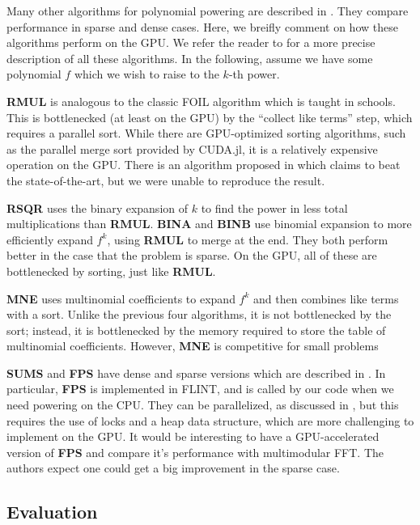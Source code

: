 Many other algorithms 
for polynomial powering
are described in \cite{monagan-2012-sparse-powering}. 
They compare performance in sparse and dense cases. 
Here, we breifly comment on how these algorithms perform on the GPU.
We refer the reader to \cite{monagan-2012-sparse-powering}
for a more precise description of all these algorithms.
In the following, assume we have some polynomial \(f\) which we wish 
to raise to the \(k\)-th power.

\textbf{RMUL} is analogous to the classic FOIL algorithm which is taught in schools. 
This is bottlenecked (at least on the GPU) by the ``collect like terms'' step, 
which requires a parallel sort.
While there are GPU-optimized sorting algorithms, such as the parallel merge sort
provided by CUDA.jl, it is a relatively expensive operation on the GPU.
There is an algorithm proposed in \cite{gupta-2023-gpu-sort}
which claims to beat the state-of-the-art, but we were unable to reproduce the result.

\textbf{RSQR} uses the binary expansion of \(k\) to find the power in less
total multiplications than \textbf{RMUL}.
\textbf{BINA} and \textbf{BINB} use binomial expansion to more efficiently 
expand \(f^{k}\), using \textbf{RMUL} to merge at the end.
They both perform better in the case that the problem is sparse.
On the GPU, all of these are bottlenecked by sorting, just like
\textbf{RMUL}.

\textbf{MNE} uses multinomial coefficients to expand \(f^{k}\) 
and then combines like terms with a sort. 
Unlike the previous four algorithms, it is not bottlenecked by the sort;
instead, it is bottlenecked by the memory required to store the table of
multinomial coefficients. However, \textbf{MNE} is 
competitive for small problems

\textbf{SUMS} and \textbf{FPS} have dense and sparse versions which are described in 
\cite{monagan-2012-sparse-powering}.
In particular, \textbf{FPS} is implemented in FLINT, and is called by our
code when we need powering on the CPU.
They can be parallelized, as discussed in \cite{monagan-2012-sparse-powering},
but this requires the use of locks and a heap data structure,
which are more challenging to implement on the GPU.
It would be interesting to have a GPU-accelerated version of
\textbf{FPS} and compare it's performance with 
multimodular FFT.
The authors expect one could get a big improvement in the sparse case.

\subsection{Evaluation}

